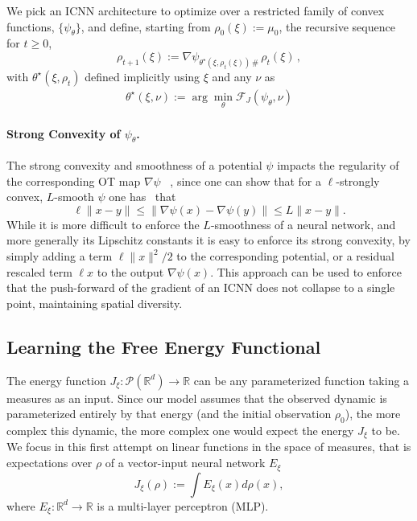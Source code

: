 We pick an ICNN architecture to optimize over a restricted family of convex functions, $\{\psi_{\theta}\}$, and define, starting from $\rho_0(\xi):=\mu_0$, the recursive sequence for $t\geq 0$,
\begin{equation} \label{eq:next_pop}
\rho_{t+1}(\xi) := \nabla \psi_{\theta^\star\!(\xi, \rho_t(\xi))\, \#}\, \rho_{t}(\xi)\,,
\end{equation}
with $\theta^\star(\xi, \rho_t)$ defined implicitly using $\xi$ and any $\nu$ as 
\begin{align} \label{eq:thetastar}
    \theta^\star(\xi, \nu):=\arg \min_{\theta} \mathcal{F}_J(\psi_{\theta},\nu)
\end{align}

\vspace{-20pt} \paragraph{Strong Convexity of $\psi_\theta$.} The strong convexity and smoothness of a potential $\psi$ impacts the regularity of the corresponding OT map $\nabla\psi$ ~\citep{caffarelli2000monotonicity,figalli2010optimal}, since one can show that for a $\ell$-strongly convex, $L$-smooth $\psi$ one has~\citep{paty2020regularity} that
$$
\ell \|x - y\| \leq \|\nabla\psi(x) -\nabla\psi(y)\|  \leq L\|x - y\|.
$$
While it is more difficult to enforce the $L$-smoothness of a neural network, and more generally its Lipschitz constants \citep{scaman2018lipschitz} it is easy to enforce its strong convexity, by simply adding a term $\ell \|x\|^2/2$ to the corresponding potential, or a residual rescaled term $\ell x$ to the output $\nabla\psi(x)$. This approach can be used to enforce that the push-forward of the gradient of an ICNN does not collapse to a single point, maintaining spatial diversity.

\subsection{Learning the Free Energy Functional}  \label{sec:learn_energy}
The energy function $J_\xi : \mathcal{P}(\mathbb{R}^d) \rightarrow \mathbb{R}$ can be any parameterized function taking a measures as an input. 
Since our model assumes that the observed dynamic is parameterized entirely by that energy (and the initial observation $\rho_0$), the more complex this dynamic, the more complex one would expect the energy $J_\xi$ to be. We focus in this first attempt on linear functions in the space of measures, that is expectations over $\rho$ of a vector-input neural network $E_\xi$
\begin{equation} \label{eq:energy}
    J_\xi(\rho) := \int E_\xi(x) d\rho(x),
\end{equation}
where $E_\xi:\mathbb{R}^d \rightarrow \mathbb{R}$ is a multi-layer perceptron (MLP).



